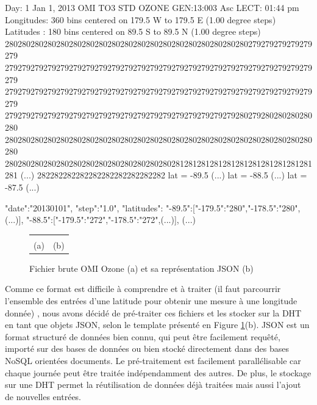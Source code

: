 \begin{myverbbox}[\tiny]{\TOMS}
	Day:   1 Jan  1, 2013    OMI TO3    STD OZONE    GEN:13:003 Asc LECT: 01:44 pm 
	Longitudes:  360 bins centered on 179.5  W  to 179.5  E   (1.00 degree steps)
	Latitudes :  180 bins centered on  89.5  S  to  89.5  N   (1.00 degree steps)
	280280280280280280280280280280280280280280280280280280280279279279279279279
	279279279279279279279279279279279279279279279279279279279279279279279279279
	279279279279279279279279279279279279279279279279279279279279279279279279279
	279279279279279279279279279279279279279279279279279279280279280280280280280
	280280280280280280280280280280280280280280280280280280280280280280280280280
	280280280280280280280280280280280280280281281281281281281281281281281281281
	(...)
	282282282282282282282282282282   lat =  -89.5
	(...)   lat =  -88.5
	(...)   lat =  -87.5
	(...)
\end{myverbbox}

\begin{myverbbox}[\tiny]{\JSON}
	{
		"date":"20130101",
		"step":"1.0",
		"latitudes":{
			"-89.5":["-179.5":"280","-178.5":"280",(...)],
			"-88.5":["-179.5":"272","-178.5":"272",(...)],
			(...)
		}
	}
\end{myverbbox}

\begin{figure}
	\centering
	\begin{tabular}{cc}
		\imagetop{\TOMS}&\imagetop{\JSON}\\
		{\small (a)}&{\small (b)}
	\end{tabular}
	\vspace{-0.2cm}
	\caption{Fichier brute OMI Ozone (a) et sa représentation JSON (b)}\label{fig:toms}
	\vspace{-0.3cm}
	
\end{figure}

Comme ce format est difficile à comprendre et à traiter (il faut parcourrir l'ensemble des entrées d'une latitude pour obtenir une mesure à une longitude donnée) , nous avons décidé de pré-traiter ces fichiers et les stocker sur la DHT en tant que objets JSON, selon le template présenté en Figure \ref{fig:toms}(b). JSON est un format structuré de données bien connu, qui peut être facilement requêté, importé sur des bases de données ou bien stocké directement dans des bases NoSQL orientées  documents. Le pré-traitement est facilement parallélisable car chaque journée peut être traitée indépendamment des autres. De plus, le stockage sur une DHT permet la réutilisation de données déjà traitées mais aussi l'ajout de nouvelles entrées. 

